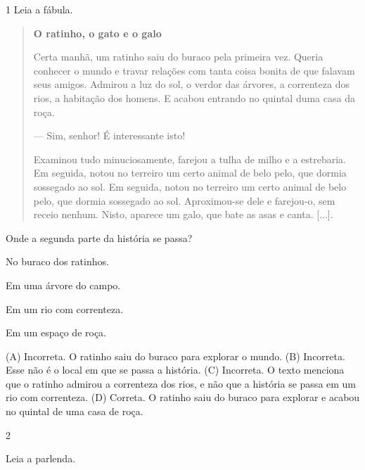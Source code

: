 
\num{1} Leia a fábula.

\begin{quote}
\textbf{O ratinho, o gato e o galo}

Certa manhã, um ratinho saiu do buraco pela primeira vez. Queria
conhecer o mundo e travar relações com tanta coisa bonita de que falavam
seus amigos. Admirou a luz do sol, o verdor das árvores, a correnteza
dos rios, a habitação dos homens. E acabou entrando no quintal duma casa
da roça.

--- Sim, senhor! É interessante isto!

Examinou tudo minuciosamente, farejou a tulha de milho e a estrebaria.
Em seguida, notou no terreiro um certo animal de belo pelo, que dormia
sossegado ao sol. Em seguida, notou no terreiro um certo animal de belo
pelo, que dormia sossegado ao sol. Aproximou-se dele e farejou-o, sem
receio nenhum. Nisto, aparece um galo, que bate as asas e canta.
{[}...{]}.

\end{quote}

Onde a segunda parte da história se passa?

\begin{escolha}
\item No buraco dos ratinhos.

\item Em uma árvore do campo.

\item Em um rio com correnteza.

\item Em um espaço de roça.
\end{escolha}


(A) Incorreta. O ratinho saiu do buraco para explorar o mundo.
(B) Incorreta. Esse não é o local em que se passa a história.
(C) Incorreta. O texto menciona que o ratinho admirou a correnteza dos
rios, e não que a história se passa em um rio com correnteza.
(D) Correta. O ratinho saiu do buraco para explorar e acabou no quintal
de uma casa de roça.

\num{2}

Leia a parlenda.

